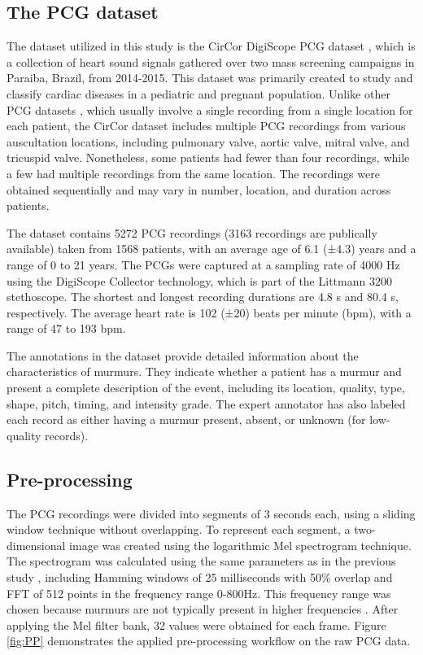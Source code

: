 \documentclass{article}
\begin{document}
\subsection{The PCG dataset}
The dataset utilized in this study is the CirCor DigiScope PCG dataset \cite{Reyna2022.08.11.22278688,oliveira2021circor}, which is a collection of heart sound signals gathered over two mass screening campaigns in Paraiba, Brazil, from 2014-2015. This dataset was primarily created to study and classify cardiac diseases in a pediatric and pregnant population. Unlike other PCG datasets \cite{clifford2016classification,kazemnejad2021open}, which usually involve a single recording from a single location for each patient, the CirCor dataset includes multiple PCG recordings from various auscultation locations, including pulmonary valve, aortic
valve, mitral valve, and tricuspid valve. Nonetheless, some patients had fewer than four recordings, while a few had multiple recordings from the same location. The recordings were obtained sequentially and may vary in number, location, and duration across patients.

\par The dataset contains 5272 PCG recordings (3163 recordings are publically available) taken from 1568 patients, with an average age of 6.1 (±4.3) years and a range of 0 to 21 years. The PCGs were captured at a sampling rate of 4000 Hz using the DigiScope Collector technology, which is part of the Littmann 3200 stethoscope. The shortest and longest recording durations are 4.8 s and 80.4 s, respectively. The average heart rate is 102 (±20) beats per minute (bpm), with a range of 47 to 193 bpm.

\par The annotations in the dataset provide detailed information about the characteristics of murmurs. They indicate whether a patient has a murmur and present a complete description of the event, including its location, quality, type, shape, pitch, timing, and intensity grade. The expert annotator has also labeled each record as either having a murmur present, absent, or unknown (for low-quality records).


\subsection{Pre-processing}
The PCG recordings were divided into segments of 3 seconds each, using a sliding window technique without overlapping. To represent each segment, a two-dimensional image was created using the logarithmic Mel spectrogram technique. The spectrogram was calculated using the same parameters as in the previous study \cite{elola2022beyond}, including Hamming windows of 25 milliseconds with 50\% overlap and FFT of 512 points in the frequency range 0-800Hz. This frequency range was chosen because murmurs are not typically present in higher frequencies \cite{mcgee2018auscultation}. After applying the Mel filter bank, 32 values were obtained for each frame. Figure \ref{fig:PP} demonstrates the applied pre-processing workflow on the raw PCG data.
\end{document}
